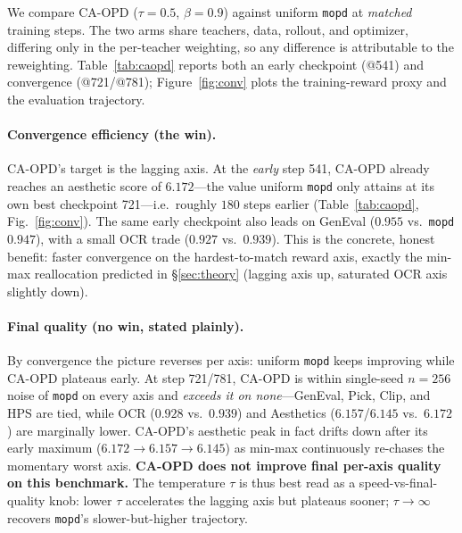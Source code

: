 We compare CA-OPD ($\tau{=}0.5$, $\beta{=}0.9$) against uniform \texttt{mopd} at
\emph{matched} training steps. The two arms share teachers, data, rollout, and
optimizer, differing only in the per-teacher weighting, so any difference is
attributable to the reweighting. Table~\ref{tab:caopd} reports both an early
checkpoint (@541) and convergence (@721/@781); Figure~\ref{fig:conv} plots the
training-reward proxy and the evaluation trajectory.

\paragraph{Convergence efficiency (the win).}
CA-OPD's target is the lagging axis. At the \emph{early} step 541, CA-OPD already
reaches an aesthetic score of $6.172$---the value uniform \texttt{mopd} only
attains at its own best checkpoint 721---i.e.\ roughly $180$ steps earlier
(Table~\ref{tab:caopd}, Fig.~\ref{fig:conv}). The same early checkpoint also leads
on GenEval ($0.955$ vs.\ \texttt{mopd} $0.947$), with a small OCR trade
($0.927$ vs.\ $0.939$). This is the concrete, honest benefit: faster convergence
on the hardest-to-match reward axis, exactly the min-max reallocation predicted in
\S\ref{sec:theory} (lagging axis up, saturated OCR axis slightly down).

\paragraph{Final quality (no win, stated plainly).}
By convergence the picture reverses per axis: uniform \texttt{mopd} keeps
improving while CA-OPD plateaus early. At step 721/781, CA-OPD is within
single-seed $n{=}256$ noise of \texttt{mopd} on every axis and \emph{exceeds it on
none}---GenEval, Pick, Clip, and HPS are tied, while OCR ($0.928$ vs.\ $0.939$)
and Aesthetics ($6.157$/$6.145$ vs.\ $6.172$) are marginally lower. CA-OPD's
aesthetic peak in fact drifts down after its early maximum
($6.172\!\to\!6.157\!\to\!6.145$) as min-max continuously re-chases the momentary
worst axis. \textbf{CA-OPD does not improve final per-axis quality on this
benchmark.} The temperature $\tau$ is thus best read as a speed-vs-final-quality
knob: lower $\tau$ accelerates the lagging axis but plateaus sooner;
$\tau\to\infty$ recovers \texttt{mopd}'s slower-but-higher trajectory.

